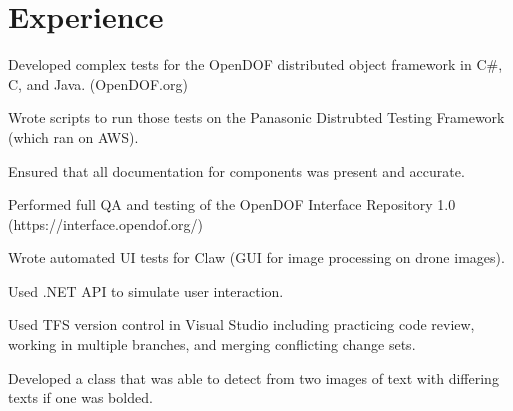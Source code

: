 \documentclass[letterpaper]{deedy-resume} %
\begin{document}
\begin{minipage}[t]{0.64\textwidth} %


\section{Experience}


\vspace{\topsep} %
\begin{tightitemize}
\item Developed complex tests for the OpenDOF distributed object framework in C\#, C, and Java. (OpenDOF.org)
\item Wrote scripts to run those tests on the Panasonic Distrubted Testing Framework (which ran on AWS).
\item Ensured that all documentation for components was present and accurate.
\item Performed full QA and testing of the OpenDOF Interface Repository 1.0 (https://interface.opendof.org/)
\end{tightitemize}

\sectionspace



\begin{tightitemize}
\item Wrote automated UI tests for Claw (GUI for image processing on drone images).
\item Used .NET API to simulate user interaction.
\item Used TFS version control in Visual Studio including practicing code review, working in multiple branches, and merging conflicting change sets.
\item Developed a class that was able to detect from two images of text with differing texts if one was bolded.
\end{tightitemize}


\end{minipage}
\end{document}
